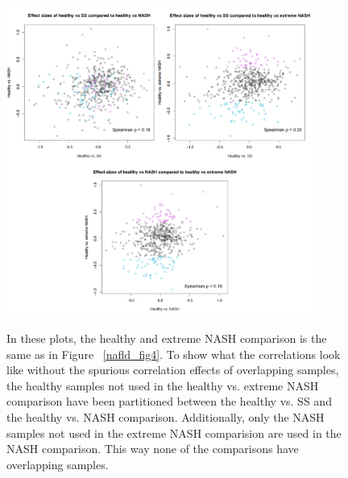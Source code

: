 \section*{}

\begin{figure}[h]
\paragraph*{}\DIFaddFL{\mbox{}}\\
\includegraphics[width=0.9\textwidth]{nafld_16s_effect_sizes_partitioned_healthy.png}
\caption[NAFLD comparision effect sizes, with non overlapping healthy samples.]{{\bf {}} In these plots, the healthy and extreme NASH comparison is the same as in Figure ~\ref{nafld_fig4}. To show what the correlations look like without the spurious correlation effects of overlapping samples, the healthy samples not used in the healthy vs. extreme NASH comparison have been partitioned between the healthy vs. SS and the healthy vs. NASH comparison. Additionally, only the NASH samples not used in the extreme NASH comparision are used in the NASH comparison. This way none of the comparisons have overlapping samples.}
\label{nafld_non_overlapping_16s_effect}
\end{figure}
